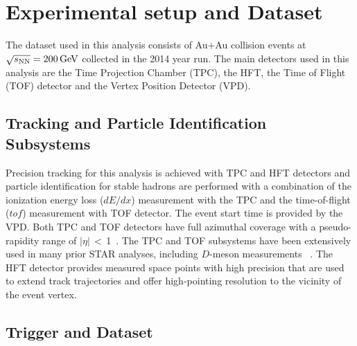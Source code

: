 \documentclass[%
 reprint,	
 amsmath,amssymb,
 aps,
 prc,
]{revtex4-1}
\begin{document}
\section{Experimental setup and Dataset}
\label{dataset}

The dataset used in this analysis consists of Au+Au collision events at ${\sqrt{s_{\rm NN}} = \rm{200\,GeV}}$ collected in the 2014 year run. The main detectors used in this analysis are the Time Projection Chamber (TPC), the HFT, the Time of Flight (TOF) detector and the Vertex Position Detector (VPD). 

\subsection{Tracking and Particle Identification Subsystems}
\label{dataset:tpctof}

Precision tracking for this analysis is achieved with TPC and HFT detectors and particle identification for stable hadrons are performed with a combination of the ionization energy loss ($dE/dx$) measurement with the TPC and the time-of-flight ($tof$) measurement with TOF detector. The event start time is provided by the VPD. Both TPC and TOF detectors have full azimuthal coverage with a pseudo-rapidity range of $|\eta|$\,$<$\,1~\cite{TPC,TOF}. The TPC and TOF subsystems have been extensively used in many prior STAR analyses, including $D$-meson measurements ~\cite{Star_D_pp,Star_D_RAA,Adamczyk:2015ukd}. The HFT detector provides measured space points with high precision that are used to extend track trajectories and offer high-pointing resolution to the vicinity of the event vertex.

\subsection{Trigger and Dataset}
\label{dataset:trigger}
\end{document}
